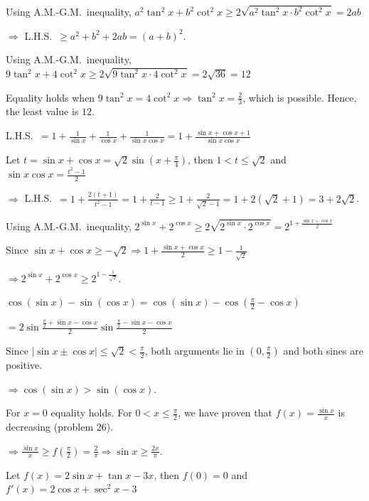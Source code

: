   Using A.M.-G.M.\ inequality, $a^2\tan^2x + b^2\cot^2x\geq 2\sqrt{a^2\tan^2x\cdot b^2\cot^2x} = 2ab$

  $\Rightarrow$ L.H.S.\ $\geq a^2 + b^2 + 2ab = (a + b)^2$.
\item Using A.M.-G.M.\ inequality, $9\tan^2x + 4\cot^2x\geq 2\sqrt{9\tan^2x\cdot 4\cot^2x} = 2\sqrt{36} = 12$

  Equality holds when $9\tan^2x = 4\cot^2x\Rightarrow \tan^2x = \frac{2}{3}$, which is possible. Hence, the
  least value is $12$.
\item L.H.S.\ $= 1 + \frac{1}{\sin x} + \frac{1}{\cos x} + \frac{1}{\sin x\cos x} = 1 + \frac{\sin x + \cos x +
  1}{\sin x\cos x}$

  Let $t = \sin x + \cos x = \sqrt{2}\sin\left(x + \frac{\pi}{4}\right)$, then $1 < t\leq \sqrt{2}$ and $\sin
  x\cos x = \frac{t^2 - 1}{2}$

  $\Rightarrow$ L.H.S.\ $= 1 + \frac{2(t + 1)}{t^2 - 1} = 1 + \frac{2}{t - 1}\geq 1 + \frac{2}{\sqrt{2} - 1} =
  1 + 2(\sqrt{2} + 1) = 3 + 2\sqrt{2}$.
\item Using A.M.-G.M.\ inequality, $2^{\sin x} + 2^{\cos x}\geq 2\sqrt{2^{\sin x}\cdot 2^{\cos x}} =
  2^{1 + \frac{\sin x + \cos x}{2}}$

  Since $\sin x + \cos x\geq -\sqrt{2}\Rightarrow 1 + \frac{\sin x + \cos x}{2}\geq 1 - \frac{1}{\sqrt{2}}$

  $\Rightarrow 2^{\sin x} + 2^{\cos x}\geq 2^{1 - \frac{1}{\sqrt{2}}}$.
\item $\cos(\sin x) - \sin(\cos x) = \cos(\sin x) - \cos\left(\frac{\pi}{2} - \cos x\right)$

  $= 2\sin\frac{\frac{\pi}{2} + \sin x - \cos x}{2}\sin\frac{\frac{\pi}{2} - \sin x - \cos x}{2}$

  Since $|\sin x\pm\cos x|\leq \sqrt{2} < \frac{\pi}{2}$, both arguments lie in $\left(0,
  \frac{\pi}{2}\right)$ and both sines are positive.

  $\Rightarrow \cos(\sin x) > \sin(\cos x)$.
\item For $x = 0$ equality holds. For $0 < x\leq \frac{\pi}{2}$, we have proven that $f(x) = \frac{\sin x}{x}$
  is decreasing (problem 26).

  $\Rightarrow \frac{\sin x}{x}\geq f\left(\frac{\pi}{2}\right) = \frac{2}{\pi}\Rightarrow \sin x\geq
  \frac{2x}{\pi}$.
\item Let $f(x) = 2\sin x + \tan x - 3x$, then $f(0) = 0$ and $f'(x) = 2\cos x + \sec^2x - 3$

